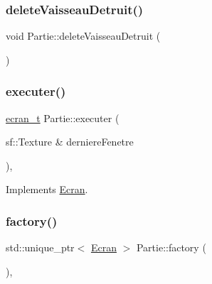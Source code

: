 \mbox{\label{class_partie_ae3caf4ac1e50ac945783b1a0d79a85c7}} 
\subsubsection{\texorpdfstring{delete\+Vaisseau\+Detruit()}{deleteVaisseauDetruit()}}
{\footnotesize\ttfamily void Partie\+::delete\+Vaisseau\+Detruit (\begin{DoxyParamCaption}{ }\end{DoxyParamCaption})}

\mbox{\label{class_partie_a20962c87a84b89afc4bde92dcc74ac0d}} 
\subsubsection{\texorpdfstring{executer()}{executer()}}
{\footnotesize\ttfamily \mbox{\hyperlink{constantes_8h_a33e4f15dde10f34860a6b35be343ae56}{ecran\+\_\+t}} Partie\+::executer (\begin{DoxyParamCaption}\item[{sf\+::\+Texture \&}]{derniere\+Fenetre }\end{DoxyParamCaption})\hspace{0.3cm}{\ttfamily [override]}, {\ttfamily [virtual]}}



Implements \mbox{\hyperlink{class_ecran_a764dadf20079744d3f5dd633eae268cc}{Ecran}}.

\mbox{\label{class_partie_ae0a8a91c00a070f0b324547a0075abc5}} 
\subsubsection{\texorpdfstring{factory()}{factory()}}
{\footnotesize\ttfamily std\+::unique\+\_\+ptr$<$ \mbox{\hyperlink{class_ecran}{Ecran}} $>$ Partie\+::factory (\begin{DoxyParamCaption}{ }\end{DoxyParamCaption})\hspace{0.3cm}{\ttfamily [override]}, {\ttfamily [virtual]}}



